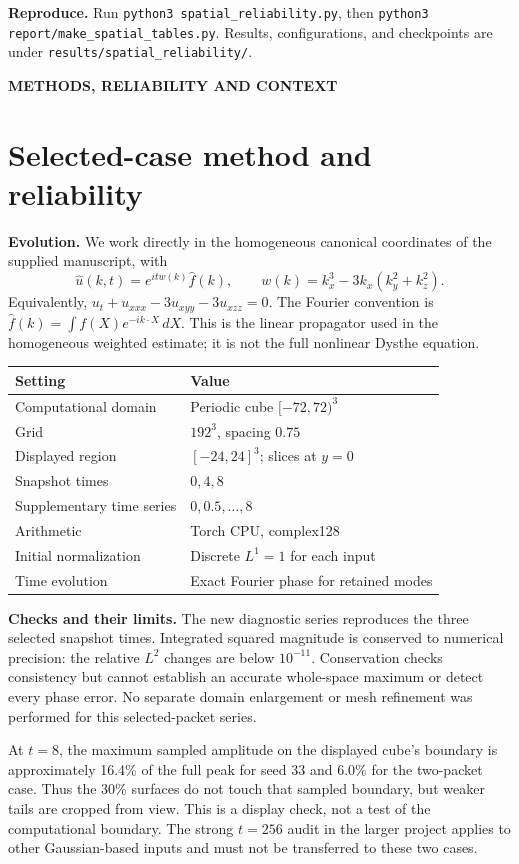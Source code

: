 \documentclass[10pt,letterpaper]{article}
\newcommand{\eyebrow}[1]{{\color{teal}\normalsize\bfseries #1}\par}
\newcommand{\tagline}[1]{\eyebrow{#1}}
\begin{document}
\textbf{Reproduce.} Run \texttt{python3 spatial\_reliability.py}, then
\texttt{python3 report/make\_spatial\_tables.py}. Results, configurations, and
checkpoints are under \texttt{results/spatial\_reliability/}.
\newpage
{}\label{selectedmethods}

\tagline{METHODS, RELIABILITY AND CONTEXT}
\section*{Selected-case method and reliability}
\textbf{Evolution.} We work directly in the homogeneous canonical coordinates of
the supplied manuscript, with
\[
 \widehat u(k,t)=e^{itw(k)}\widehat f(k),\qquad
 w(k)=k_x^3-3k_x(k_y^2+k_z^2).
\]
Equivalently, $u_t+u_{xxx}-3u_{xyy}-3u_{xzz}=0$. The Fourier convention is
$\widehat f(k)=\int f(X)e^{-ik\cdot X}\,dX$. This is the linear propagator used
in the homogeneous weighted estimate; it is not the full nonlinear Dysthe equation.

\begin{center}\begin{tabular}{ll}\toprule
Setting & Value\\\midrule
Computational domain & Periodic cube $[-72,72)^3$\\
Grid & $192^3$, spacing $0.75$\\
Displayed region & $[-24,24]^3$; slices at $y=0$\\
Snapshot times & $0,4,8$\\
Supplementary time series & $0,0.5,\ldots,8$\\
Arithmetic & Torch CPU, complex128\\
Initial normalization & Discrete $L^1=1$ for each input\\
Time evolution & Exact Fourier phase for retained modes\\\bottomrule
\end{tabular}\end{center}
\textbf{Checks and their limits.} The new diagnostic series reproduces the three
selected snapshot times. Integrated squared magnitude is conserved to numerical
precision: the relative $L^2$ changes are below $10^{-11}$. Conservation checks
consistency but cannot establish an accurate whole-space maximum or detect every
phase error. No separate domain enlargement or mesh refinement was performed for
this selected-packet series.

At $t=8$, the maximum sampled amplitude on the displayed cube's boundary is
approximately 16.4\% of the full peak for seed 33 and 6.0\% for the two-packet case.
Thus the 30\% surfaces do not touch that sampled boundary, but weaker tails are
cropped from view. This is a display check, not a test of the computational boundary.
The strong $t=256$ audit in the larger project applies to other Gaussian-based
inputs and must not be transferred to these two cases.
\end{document}
